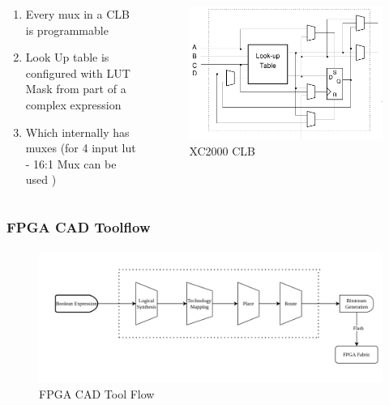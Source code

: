 \documentclass{beamer}
\begin{document}
{\begin{frame}[fragile]
  \begin{columns}
   \begin{column}{0.5\textwidth}
     \begin{enumerate}
     	\item Every mux in a CLB is programmable
	\item Look Up table is configured with LUT Mask from part of a complex expression 
	\item Which internally has muxes (for 4 input lut - 16:1 Mux can be used )
     \end{enumerate}
    \end{column}
   \begin{column}{0.5\textwidth}		
   \begin{figure}[h]
       \centering
       \includegraphics[width=1\linewidth]{images/xc2000clb.png} 
       \caption{XC2000 CLB}
       \label{exa_block}
    \end{figure}
   \end{column}
   \end{columns}
\end{frame}

\begin{frame}[fragile]
  \frametitle{FPGA CAD Toolflow}
  \framesubtitle{}
   \begin{figure}
        \centering
        \includegraphics[width=1\linewidth]{images/cad_flow.png}
        \caption{FPGA CAD Tool Flow}
        \label{exa_cadflow}
    \end{figure}
\end{frame}


}
\end{document}
